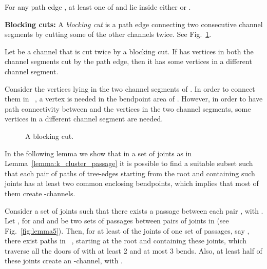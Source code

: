 \documentclass[a4paper,10pt]{llncs}
\newcounter{prop}
\renewenvironment{proof}
{{\bf Proof:}}{\hspace*{\fill}\par\vspace{2mm}}
\newcommand{\T}{\mbox{ }}
\begin{document}
\begin{property}\label{prop:CS_1_2}
For any path edge , at least one of  and  lie inside either  or .
\end{property}

{\bf Blocking cuts:}
A \emph{blocking cut} is a path edge connecting two consecutive channel segments by cutting some of the other channels twice. See Fig.~\ref{fig:blocking}.

\begin{property}\label{prop:blocking-cut}
Let  be a channel that is cut twice by a blocking cut. If  has vertices in both the channel segments cut by the path edge, then it has some vertices in a different channel segment.
\end{property}
\begin{proof}
Consider the vertices lying in the two channel segments of . In order to connect them in \T, a vertex  is needed in the bendpoint area of . However, in order to have path connectivity between  and the vertices in the two channel segments, some vertices in a different channel segment are needed.
\end{proof}

\begin{figure}[hb]
\caption{A blocking cut.}
\label{fig:blocking}
\end{figure}

In the following lemma we show that in a set of joints as in Lemma~\ref{lemma:k_cluster_passage} it is possible to find a suitable subset such that each pair of paths of tree-edges starting from the root and containing such joints has at least two common enclosing bendpoints, which implies that most of them create -channels.

\begin{lemma}\label{lemma:2_channels}
Consider a set of joints  such that there exists a passage between each pair , with . Let , for  and  and  be two sets of passages between pairs of joints in  (see Fig.~\ref{fig:lemma5}). Then, for at least  of the joints of one set of passages, say , there exist paths in \T, starting at the root and containing these joints, which traverse all the doors of  with at least 2 and at most 3 bends. Also, at least half of these joints create an -channel, with .
\end{lemma}
\end{document}
